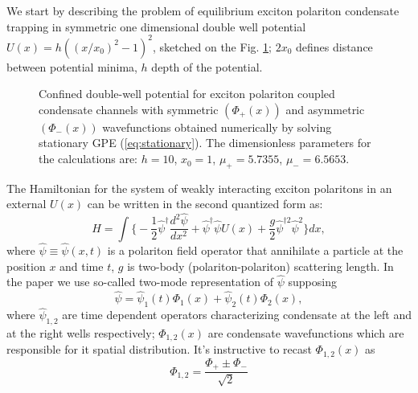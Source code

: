\documentclass[aps, pre, preprint, groupedaddress, superscriptaddress, showkeys, showpacs] {revtex4-1}
\begin{document}
We start by describing the problem of equilibrium exciton polariton condensate trapping in symmetric one dimensional double well potential $U(x) = h ((x/x_0)^2 - 1)^2$, sketched on the Fig. \ref{pic:potential_sym_asym}; $2x_0$ defines distance between potential minima, $h$ depth of the potential.
% 
\begin{figure}[ht]
\caption{
Confined double-well potential for exciton polariton coupled condensate channels with symmetric $(\Phi_+(x))$ and asymmetric $(\Phi_-(x))$ wavefunctions obtained numerically by solving stationary GPE (\ref{eq:stationary}).
The dimensionless parameters for the calculations are: $h = 10$, $x_0 = 1$, $\mu_+ = 5.7355$, $\mu_- = 6.5653$.
\label{pic:potential_sym_asym}
}
\end{figure}
%
The Hamiltonian for the system of weakly interacting exciton polaritons in an external $U(x)$ can be written in the second quantized form as:
%
\begin{equation}
\hat{H} = \int \Big\{ -\dfrac{1}{2} \hat{\psi}^\dag \dfrac{d^2 \hat{\psi}}{dx^2} + \hat{\psi}^\dag \hat{\psi} U(x) + \dfrac{g}{2} \hat{\psi}^{\dag 2} \hat{\psi}^2  \Big\} dx,
\label{eq:gpe_hamiltonian}
\end{equation}
%
where $\hat{\psi} \equiv \hat{\psi}(x, t)$ is a polariton field operator that annihilate a particle at the position $x$ and time $t$, $g$ is two-body (polariton-polariton) scattering length.
In the paper we use so-called two-mode representation of $\hat{\psi}$ supposing
%
\begin{equation}
\hat{\psi} = \hat{\psi}_1(t) \Phi_1(x) + \hat{\psi}_2(t) \Phi_2(x),
\label{eq:two_modes}
\end{equation}
%
where $\hat{\psi}_{1,2}$ are time dependent operators characterizing condensate at the left and at the right wells respectively; $\Phi_{1,2}(x)$ are condensate wavefunctions which are responsible for it spatial distribution.
It's instructive to recast $\Phi_{1,2}(x)$ as
%
\begin{equation}
\Phi_{1,2} = \dfrac{\Phi_+ \pm \Phi_-}{\sqrt{2}}
\label{eq:basic_modes}
\end{equation}
\end{document}
